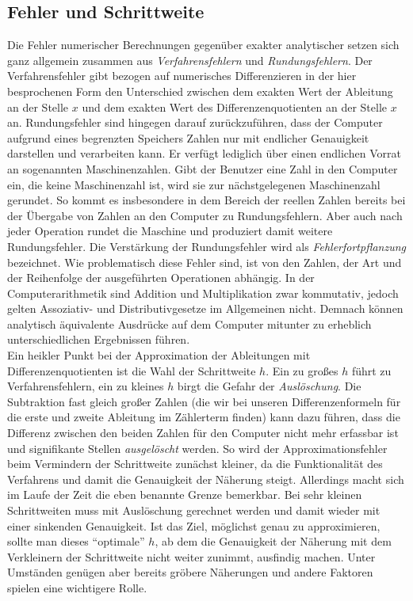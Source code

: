 \documentclass{scrartcl}
\begin{document}
\subsection{Fehler und Schrittweite}
\label{ssec:schrittweite}
Die Fehler numerischer Berechnungen gegenüber exakter analytischer setzen sich ganz allgemein zusammen aus \textit{Verfahrensfehlern} und \textit{Rundungsfehlern}.\cite{westermann} Der Verfahrensfehler gibt bezogen auf numerisches Differenzieren in der hier besprochenen Form den Unterschied zwischen dem exakten Wert der Ableitung an der Stelle $x$ und dem exakten Wert des Differenzenquotienten an der Stelle $x$ an. Rundungsfehler sind hingegen darauf zurückzuführen, dass der Computer aufgrund eines begrenzten Speichers Zahlen nur mit endlicher Genauigkeit darstellen und verarbeiten kann. Er verfügt lediglich über einen endlichen Vorrat an sogenannten Maschinenzahlen. Gibt der Benutzer eine Zahl in den Computer ein, die keine Maschinenzahl ist, wird sie zur nächstgelegenen Maschinenzahl gerundet. So kommt es insbesondere in dem Bereich der reellen Zahlen bereits bei der Übergabe von Zahlen an den Computer zu Rundungsfehlern. Aber auch nach jeder Operation rundet die Maschine und produziert damit weitere Rundungsfehler. Die Verstärkung der Rundungsfehler wird als \textit{Fehlerfortpflanzung} bezeichnet. Wie problematisch diese Fehler sind, ist von den Zahlen, der Art und der Reihenfolge der ausgeführten Operationen abhängig. In der Computerarithmetik sind Addition und Multiplikation zwar kommutativ, jedoch gelten Assoziativ- und Distributivgesetze im Allgemeinen nicht. Demnach können analytisch äquivalente Ausdrücke auf dem Computer mitunter zu erheblich unterschiedlichen Ergebnissen führen.\cite{nla} \\
Ein heikler Punkt bei der Approximation der Ableitungen mit Differenzenquotienten ist die Wahl der Schrittweite $h$. Ein zu großes $h$ führt zu Verfahrensfehlern, ein zu kleines $h$ birgt die Gefahr der \textit{Auslöschung}. Die Subtraktion fast gleich großer Zahlen (die wir bei unseren Differenzenformeln für die erste und zweite Ableitung im Zählerterm finden) kann dazu führen, dass die Differenz zwischen den beiden Zahlen für den Computer nicht mehr erfassbar ist und signifikante Stellen \textit{ausgelöscht} werden.\cite{am}
So wird der Approximationsfehler beim Vermindern der Schrittweite zunächst kleiner, da die Funktionalität des Verfahrens und damit die Genauigkeit der Näherung steigt.
Allerdings macht sich im Laufe der Zeit die eben benannte Grenze bemerkbar. Bei sehr kleinen Schrittweiten muss mit Auslöschung gerechnet werden und damit wieder mit einer sinkenden Genauigkeit.\cite{schneebeli}
Ist das Ziel, möglichst genau zu approximieren, sollte man dieses "`optimale"' $h$, ab dem die Genauigkeit der Näherung mit dem Verkleinern der Schrittweite nicht weiter zunimmt, ausfindig machen. Unter Umständen genügen aber bereits gröbere Näherungen und andere Faktoren spielen eine wichtigere Rolle. \\
\end{document}
